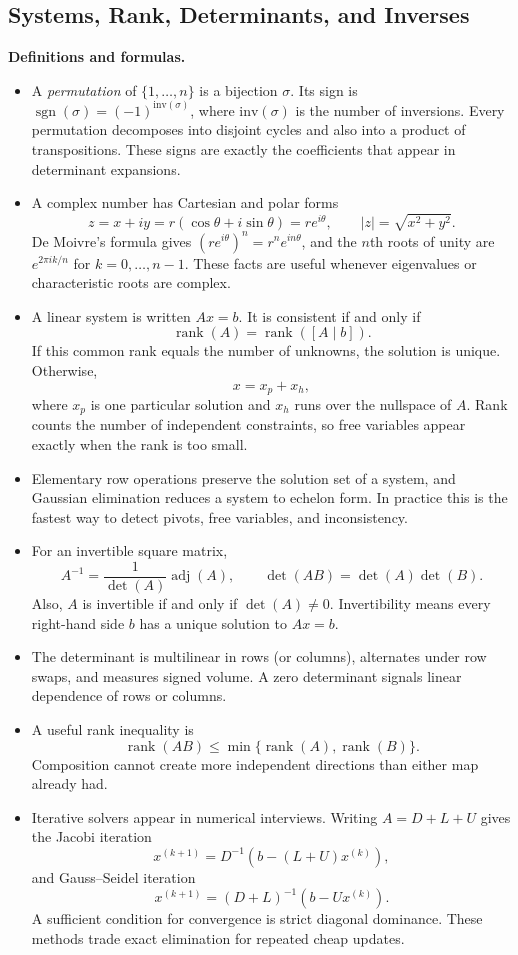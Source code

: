 \documentclass[11pt]{article}
\theoremstyle{definition}
\newcommand{\rank}{\operatorname{rank}}
\newcommand{\sgn}{\operatorname{sgn}}
\begin{document}
\subsection{Systems, Rank, Determinants, and Inverses}
\textbf{Definitions and formulas.}
\begin{itemize}
    \item A \emph{permutation} of $\{1,\dots,n\}$ is a bijection $\sigma$. Its sign is $\sgn(\sigma)=(-1)^{\mathrm{inv}(\sigma)}$, where $\mathrm{inv}(\sigma)$ is the number of inversions. Every permutation decomposes into disjoint cycles and also into a product of transpositions. These signs are exactly the coefficients that appear in determinant expansions.
    \item A complex number has Cartesian and polar forms
    \[
        z=x+iy=r(\cos\theta+i\sin\theta)=re^{i\theta}, \qquad |z|=\sqrt{x^2+y^2}.
    \]
    De Moivre's formula gives $(re^{i\theta})^n=r^n e^{in\theta}$, and the $n$th roots of unity are $e^{2\pi i k/n}$ for $k=0,\dots,n-1$. These facts are useful whenever eigenvalues or characteristic roots are complex.
    \item A linear system is written $Ax=b$. It is consistent if and only if
    \[
        \rank(A)=\rank([A\mid b]).
    \]
    If this common rank equals the number of unknowns, the solution is unique. Otherwise,
    \[
        x=x_p+x_h,
    \]
    where $x_p$ is one particular solution and $x_h$ runs over the nullspace of $A$. Rank counts the number of independent constraints, so free variables appear exactly when the rank is too small.
    \item Elementary row operations preserve the solution set of a system, and Gaussian elimination reduces a system to echelon form. In practice this is the fastest way to detect pivots, free variables, and inconsistency.
    \item For an invertible square matrix,
    \[
        A^{-1}=\frac{1}{\det(A)}\operatorname{adj}(A), \qquad \det(AB)=\det(A)\det(B).
    \]
    Also, $A$ is invertible if and only if $\det(A)\neq 0$. Invertibility means every right-hand side $b$ has a unique solution to $Ax=b$.
    \item The determinant is multilinear in rows (or columns), alternates under row swaps, and measures signed volume. A zero determinant signals linear dependence of rows or columns.
    \item A useful rank inequality is
    \[
        \rank(AB) \le \min\{\rank(A),\rank(B)\}.
    \]
    Composition cannot create more independent directions than either map already had.
    \item Iterative solvers appear in numerical interviews. Writing $A=D+L+U$ gives the Jacobi iteration
    \[
        x^{(k+1)} = D^{-1}(b-(L+U)x^{(k)}),
    \]
    and Gauss--Seidel iteration
    \[
        x^{(k+1)} = (D+L)^{-1}(b-Ux^{(k)}).
    \]
    A sufficient condition for convergence is strict diagonal dominance. These methods trade exact elimination for repeated cheap updates.
\end{itemize}
\end{document}
